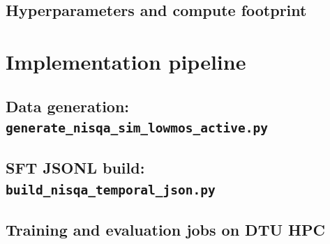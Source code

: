 \subsection{Hyperparameters and compute footprint}

\section{Implementation pipeline} \label{sec:method-pipeline}
\subsection{Data generation: \texttt{generate\_nisqa\_sim\_lowmos\_active.py}}
\subsection{SFT JSONL build: \texttt{build\_nisqa\_temporal\_json.py}}
\subsection{Training and evaluation jobs on DTU HPC}
